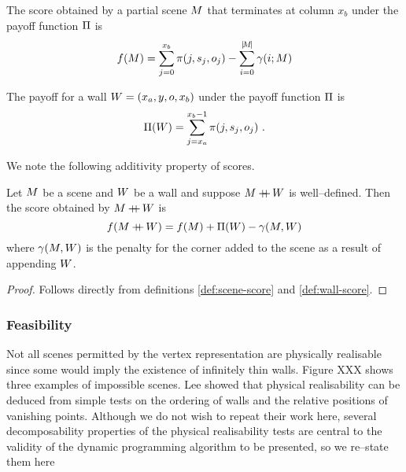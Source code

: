 \begin{definition}
  \label{def:scene-score}
  The score obtained by a partial scene $\PartialScene$ that
  terminates at column $x_b$ under the payoff function $\ScenePayoff$
  is 
  \begin{equation}
    \Objective(\PartialScene) = \sum_{j=0}^{x_b} 
      \PixelPayoff(j,\seam_j,\WallOrient_j) - 
      \sum_{i=0}^{\SceneLen} \CornerPenalty(i;\PartialScene)
  \end{equation}
\end{definition}

\begin{definition}
  \label{def:wall-score}
  The payoff for a wall $\Wall=(x_a,y,\WallOrient,x_b)$ under the
  payoff function $\ScenePayoff$ is
  \begin{equation}
    \WallPayoff(\Wall) = \sum_{j=x_a}^{x_b-1}
      \PixelPayoff(j,\seam_j,\WallOrient_j) ~.
  \end{equation}
\end{definition}

We note the following additivity property of scores.

\begin{lemma}
  \label{lemma:additive-scores}
  Let $\Scene$ be a scene and $\Wall$ be a wall and suppose
  $\Scene\concat\Wall$ is well--defined. Then the score obtained by
  $\Scene\concat\Wall$ is
  \begin{equation}
    \Objective(\Scene\concat\Wall) = 
      \Objective(\Scene) + \WallPayoff(\Wall) - 
      \CornerPenalty(\Scene,\Wall)
  \end{equation}
  where $\CornerPenalty(\Scene,\Wall)$ is the penalty
  for the corner added to the scene as a result of appending $\Wall$.
\end{lemma}
\begin{proof}
  Follows directly from definitions \ref{def:scene-score} and
  \ref{def:wall-score}.
\end{proof}

\subsubsection{Feasibility}

Not all scenes permitted by the vertex representation are physically
realisable since some would imply the existence of infinitely thin
walls. Figure XXX shows three examples of impossible scenes. Lee \etal
\cite{Lee09} showed that physical realisability can be deduced from
simple tests on the ordering of walls and the relative positions of
vanishing points. Although we do not wish to repeat their work here,
several decomposability properties of the physical realisability tests
are central to the validity of the dynamic programming algorithm to be
presented, so we re--state them here

